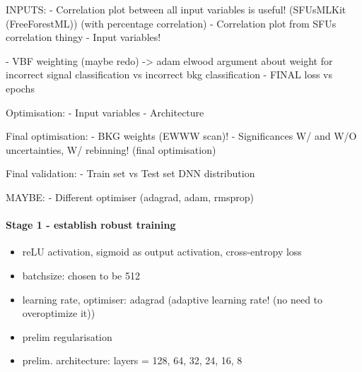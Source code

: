 INPUTS:
- Correlation plot between all input variables is useful! (SFUsMLKit (FreeForestML)) (with percentage correlation)
- Correlation plot from SFUs correlation thingy
- Input variables!

-  VBF weighting (maybe redo) -> adam elwood argument about weight for incorrect signal classification vs incorrect bkg classification
-  FINAL loss vs epochs

Optimisation: 
- Input variables
- Architecture

Final optimisation:
-  BKG weights (EWWW scan)!
-  Significances W/ and W/O uncertainties, W/ rebinning! (final optimisation)

Final validation:
- Train set vs Test set DNN distribution


MAYBE:
-  Different optimiser (adagrad, adam, rmsprop)




\paragraph{Stage 1 - establish robust training}
\begin{itemize}
    \item reLU activation, sigmoid as output activation, cross-entropy loss
    \item batchsize: chosen to be 512
    \item learning rate, optimiser: adagrad (adaptive learning rate! (no need to overoptimize it))
    \item prelim regularisation
    \item prelim. architecture: layers = 128, 64, 32, 24, 16, 8
\end{itemize}

